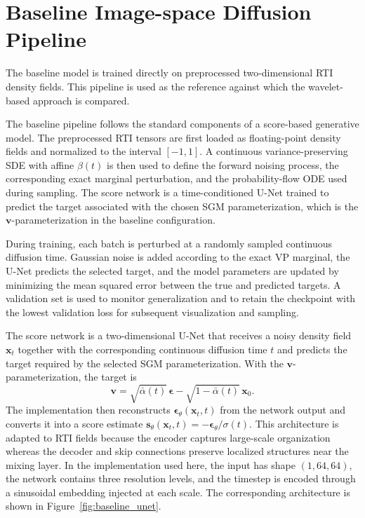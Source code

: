 \section{Baseline Image-space Diffusion Pipeline}

The baseline model is trained directly on preprocessed two-dimensional RTI density fields. This pipeline is used as the reference against which the wavelet-based approach is compared.

The baseline pipeline follows the standard components of a score-based
generative model. The preprocessed RTI tensors are first loaded as
floating-point density fields and normalized to the interval $[-1,1]$. A
continuous variance-preserving SDE with affine $\beta(t)$ is then used to define
the forward noising process, the corresponding exact marginal perturbation, and
the probability-flow ODE used during sampling. The score network is a
time-conditioned U-Net trained to predict the target associated with the chosen
SGM parameterization, which is the $\mathbf{v}$-parameterization in the
baseline configuration.

During training, each batch is perturbed at a randomly sampled continuous
diffusion time. Gaussian noise is added according to the exact VP marginal, the
U-Net predicts the selected target, and the model parameters are updated by
minimizing the mean squared error between the true and predicted targets. A
validation set is used to monitor generalization and to retain the checkpoint
with the lowest validation loss for subsequent visualization and sampling.

The score network is a two-dimensional U-Net that receives a noisy density
field $\mathbf{x}_t$ together with the corresponding continuous diffusion time
$t$ and predicts the target required by the selected SGM parameterization. With
the $\mathbf{v}$-parameterization, the target is
\[
\mathbf{v}
=
\sqrt{\bar{\alpha}(t)}\,\boldsymbol{\epsilon}
-
\sqrt{1-\bar{\alpha}(t)}\,\mathbf{x}_0.
\]
The implementation then reconstructs
$\boldsymbol{\epsilon}_{\theta}(\mathbf{x}_t,t)$ from the network output and
converts it into a score estimate
$\mathbf{s}_{\theta}(\mathbf{x}_t,t)=-\boldsymbol{\epsilon}_{\theta}/\sigma(t)$.
This architecture is adapted to RTI fields because the encoder captures
large-scale organization whereas the decoder and skip connections preserve
localized structures near the mixing layer. In the implementation used here,
the input has shape $(1,64,64)$, the network contains three resolution levels,
and the timestep is encoded through a sinusoidal embedding injected at each
scale. The corresponding architecture is shown in Figure~\ref{fig:baseline_unet}.

